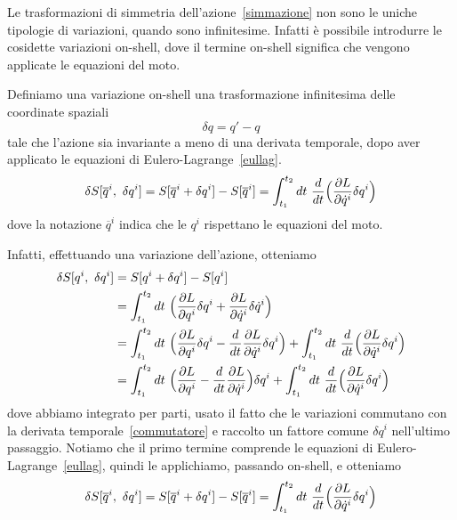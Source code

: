     Le trasformazioni di simmetria dell'azione~\eqref{simmazione} non sono le uniche tipologie di variazioni, quando sono infinitesime. Infatti è possibile introdurre le cosidette variazioni on-shell, dove il termine on-shell significa che vengono applicate le equazioni del moto. 
    \begin{definition}
        Definiamo una variazione on-shell una trasformazione infinitesima delle coordinate spaziali 
    \begin{equation}\label{simmonshell}
        \delta q = q' - q
    \end{equation} 
        tale che l'azione sia invariante a meno di una derivata temporale, dopo aver applicato le equazioni di Eulero-Lagrange~\eqref{eullag}. 
    \begin{equation} \label{invonshell}
        \delta S[\overline q^i,~\delta q^i] = S[\overline q^i + \delta q^i] - S[\overline q^i] = \int_{t_1}^{t_2}dt~ \frac{d}{dt} \Big( \frac{\partial L}{\partial\dot q^i} \delta q^i \Big )
    \end{equation}  
        dove la notazione $\overline q^i$ indica che le $q^i$ rispettano le equazioni del moto. 
    \end{definition}     

    Infatti, effettuando una variazione dell'azione, otteniamo 
    \begin{equation*}
    \begin{aligned}
        \delta S[q^i,~\delta q^i] & = S[q^i + \delta q^i] - S[q^i] \\ & = \int_{t_1}^{t_2}dt~ \Big( \frac{\partial L}{\partial q^i} \delta q^i + \frac{\partial L}{\partial\dot q^i} \delta \dot q^i \Big) \\ &= \int_{t_1}^{t_2}dt~ \Big( \frac{\partial L}{\partial q^i}  \delta q^i - \frac{d}{dt} \frac{\partial L}{\partial\dot q^i}  \delta q^i \Big )+ \int_{t_1}^{t_2}dt~ \frac{d}{dt} \Big( \frac{\partial L}{\partial\dot q^i} \delta q^i \Big ) \\ & = \int_{t_1}^{t_2}dt~ \Big( \frac{\partial L}{\partial q^i}  - \frac{d}{dt} \frac{\partial L}{\partial\dot q^i} \Big ) \delta q^i + \int_{t_1}^{t_2}dt~ \frac{d}{dt} \Big( \frac{\partial L}{\partial\dot q^i} \delta q^i \Big )
    \end{aligned}
    \end{equation*}
    dove abbiamo integrato per parti, usato il fatto che le variazioni commutano con la derivata temporale~\eqref{commutatore} e raccolto un fattore comune $\delta q^i$ nell'ultimo passaggio.
    Notiamo che il primo termine comprende le equazioni di Eulero-Lagrange~\eqref{eullag}, quindi le applichiamo, passando on-shell, e otteniamo 
    \begin{equation*} 
        \delta S[\overline q^i,~\delta q^i] = S[\overline q^i + \delta q^i] - S[\overline q^i] = \int_{t_1}^{t_2}dt~ \frac{d}{dt} \Big( \frac{\partial L}{\partial\dot q^i} \delta q^i \Big )
    \end{equation*}

